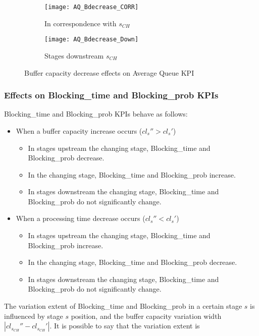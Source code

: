 \begin{landscape}
\begin{figure}[p]
\begin{subfigure}[b]{0.4\textwidth}
    \texttt{[image: AQ\_Bdecrease\_CORR]}
    \caption{In correspondence with $s_{CH}$}
    \label{fig:Buffer capacity decrease effects on Average Queue KPI - In correspondence with}   
  \end{subfigure}
  \begin{subfigure}[b]{0.4\textwidth}
    \texttt{[image: AQ\_Bdecrease\_Down]}
    \caption{Stages downstream $s_{CH}$}
    \label{fig:Buffer capacity decrease effects on Average Queue KPI - Stages downstream}   
  \end{subfigure}
  \caption{Buffer capacity decrease effects on Average Queue KPI}
  \label{fig:Buffer capacity decrease effects on Average Queue KPI}
\end{figure}
\end{landscape}
\subsubsection{Effects on Blocking\_time and Blocking\_prob KPIs}
Blocking\_time and Blocking\_prob KPIs behave as follows:
\begin{itemize}
\item When a buffer capacity increase occurs ($cl_s''>cl_s'$)
\begin{itemize}
\item In stages upstream the changing stage, Blocking\_time and Blocking\_prob decrease.
\item In the changing stage, Blocking\_time and Blocking\_prob increase.
\item In stages downstream the changing stage, Blocking\_time and Blocking\_prob do not significantly change.
\end{itemize}
\item When a processing time decrease occurs ($cl_s''<cl_s'$)
\begin{itemize}
\item In stages upstream the changing stage, Blocking\_time and Blocking\_prob increase.
\item In the changing stage, Blocking\_time and Blocking\_prob decrease.
\item In stages downstream the changing stage, Blocking\_time and Blocking\_prob do not significantly change.
\end{itemize}
\end{itemize}
The variation extent of Blocking\_time and Blocking\_prob in a certain stage $s$ is influenced by stage $s$ position, and the buffer capacity variation width $|cl_{s_{CH}}''-cl_{s_{CH}}'|$. It is possible to say that the variation extent is 
